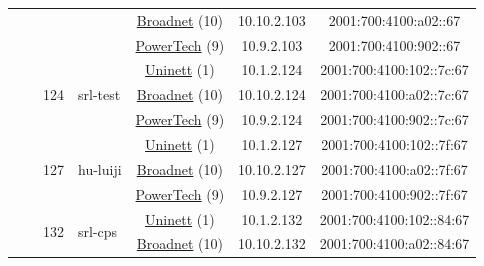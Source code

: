 \begin{small}
\begin{center}
\begin{longtable}{|c|c|c|c|c|c|c|c|}
  &  & \multicolumn{2}{|c|}{} & \multicolumn{2}{|c|}{\tiny{\href{https://www.broadnet.no}{Broadnet} (10)}} & \tiny{10.10.2.103} & \tiny{2001:700:4100:a02::67} \\* \cline{5-5}\cline{6-6}\cline{7-7}\cline{8-8}
  &  & \multicolumn{2}{|c|}{} & \multicolumn{2}{|c|}{\tiny{\href{http://www.powertech.no}{PowerTech} (9)}} & \tiny{10.9.2.103} & \tiny{2001:700:4100:902::67} \\* \cline{3-3}\cline{4-4}\cline{5-5}\cline{6-6}\cline{7-7}\cline{8-8}
  &  & \multirow{3}{*}{\tiny{124}} & \multicolumn{1}{|l|}{\multirow{3}{*}{\tiny{srl-test}}} & \multicolumn{2}{|c|}{\tiny{\href{https://www.uninett.no}{Uninett} (1)}} & \tiny{10.1.2.124} & \tiny{2001:700:4100:102::7c:67} \\* \cline{5-5}\cline{6-6}\cline{7-7}\cline{8-8}
  &  &  &  & \multicolumn{2}{|c|}{\tiny{\href{https://www.broadnet.no}{Broadnet} (10)}} & \tiny{10.10.2.124} & \tiny{2001:700:4100:a02::7c:67} \\* \cline{5-5}\cline{6-6}\cline{7-7}\cline{8-8}
  &  &  &  & \multicolumn{2}{|c|}{\tiny{\href{http://www.powertech.no}{PowerTech} (9)}} & \tiny{10.9.2.124} & \tiny{2001:700:4100:902::7c:67} \\* \cline{3-3}\cline{4-4}\cline{5-5}\cline{6-6}\cline{7-7}\cline{8-8}
  &  & \multirow{3}{*}{\tiny{127}} & \multicolumn{1}{|l|}{\multirow{3}{*}{\tiny{hu-luiji}}} & \multicolumn{2}{|c|}{\tiny{\href{https://www.uninett.no}{Uninett} (1)}} & \tiny{10.1.2.127} & \tiny{2001:700:4100:102::7f:67} \\* \cline{5-5}\cline{6-6}\cline{7-7}\cline{8-8}
  &  &  &  & \multicolumn{2}{|c|}{\tiny{\href{https://www.broadnet.no}{Broadnet} (10)}} & \tiny{10.10.2.127} & \tiny{2001:700:4100:a02::7f:67} \\* \cline{5-5}\cline{6-6}\cline{7-7}\cline{8-8}
  &  &  &  & \multicolumn{2}{|c|}{\tiny{\href{http://www.powertech.no}{PowerTech} (9)}} & \tiny{10.9.2.127} & \tiny{2001:700:4100:902::7f:67} \\* \cline{3-3}\cline{4-4}\cline{5-5}\cline{6-6}\cline{7-7}\cline{8-8}
  &  & \multirow{3}{*}{\tiny{132}} & \multicolumn{1}{|l|}{\multirow{3}{*}{\tiny{srl-cps}}} & \multicolumn{2}{|c|}{\tiny{\href{https://www.uninett.no}{Uninett} (1)}} & \tiny{10.1.2.132} & \tiny{2001:700:4100:102::84:67} \\* \cline{5-5}\cline{6-6}\cline{7-7}\cline{8-8}
  &  &  &  & \multicolumn{2}{|c|}{\tiny{\href{https://www.broadnet.no}{Broadnet} (10)}} & \tiny{10.10.2.132} & \tiny{2001:700:4100:a02::84:67} \\* \cline{5-5}\cline{6-6}\cline{7-7}\cline{8-8}

\end{longtable}
\end{center}
\end{small}
